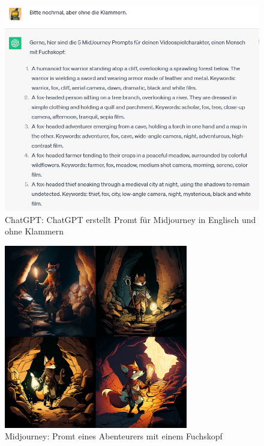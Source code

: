 \begin{figure}
	\centering
	\includegraphics[scale=0.7]{BilderFuerBA/06.png}
	\caption{ChatGPT: ChatGPT erstellt Promt für Midjourney in Englisch und ohne Klammern}
	\label{chatgpt_mj-formel_ohne_Klammern}
\end{figure}

\begin{figure}
	\centering
	\includegraphics[width=8.022cm]{BilderFuerBA/fuchsKopfAbenteuerer.png}
	\caption{Midjourney: Promt eines Abenteurers mit einem Fuchskopf}
	\label{MidjourneyFuchsKopfAbenteuerer}
\end{figure}

